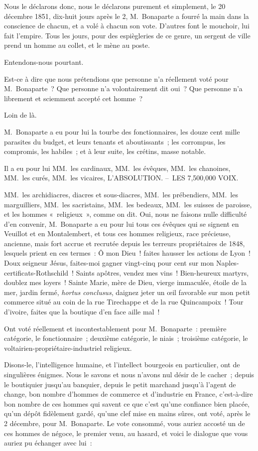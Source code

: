 \documentclass[french,twoside]{book} %
\begin{document}
\noindent Nous le déclarons donc, nous le déclarons purement et simplement, le 20 décembre 1851, dix-huit jours après le 2, M. Bonaparte a fourré la main dans la conscience de chacun, et a volé à chacun son vote. D’autres font le mouchoir, lui fait l’empire. Tous les jours, pour des espiègleries de ce genre, un sergent de ville prend un homme au collet, et le mène au poste.\par
Entendons-nous pourtant.\par
Est-ce à dire que nous prétendions que personne n’a réellement voté pour M. Bonaparte ? Que personne n’a volontairement dit oui ? Que personne n’a librement et sciemment accepté cet homme ?\par
Loin de là.\par
M. Bonaparte a eu pour lui la tourbe des fonctionnaires, les douze cent mille parasites du budget, et leurs tenants et aboutissants ; les corrompus, les compromis, les habiles ; et à leur suite, les crétins, masse notable.\par
Il a eu pour lui MM. les cardinaux, MM. les évêques, MM. les chanoines, MM. les curés, MM. les vicaires, L’ABSOLUTION. – LES 7,500,000 VOIX.\par
MM. les archidiacres, diacres et sous-diacres, MM. les prébendiers, MM. les marguilliers, MM. les sacristains, MM. les bedeaux, MM. les suisses de paroisse, et les hommes « religieux », comme on dit. Oui, nous ne faisons nulle difficulté d’en convenir, M. Bonaparte a eu pour lui tous ces évêques qui se signent en Veuillot et en Montalembert, et tous ces hommes religieux, race précieuse, ancienne, mais fort accrue et recrutée depuis les terreurs propriétaires de 1848, lesquels prient en ces termes : Ô mon Dieu ! faites hausser les actions de Lyon ! Doux seigneur Jésus, faites-moi gagner vingt-cinq pour cent sur mon Naples-certificats-Rothschild ! Saints apôtres, vendez mes vins ! Bien-heureux martyrs, doublez mes loyers ! Sainte Marie, mère de Dieu, vierge immaculée, étoile de la mer, jardin fermé, \emph{hortus conclusus}, daignez jeter un œil favorable sur mon petit commerce situé au coin de la rue Tirechappe et de la rue Quincampoix ! Tour d’ivoire, faites que la boutique d’en face aille mal !\par
Ont voté réellement et incontestablement pour M. Bonaparte : première catégorie, le fonctionnaire ; deuxième catégorie, le niais ; troisième catégorie, le voltairien-propriétaire-industriel religieux.\par
Disons-le, l’intelligence humaine, et l’intellect bourgeois en particulier, ont de singulières énigmes. Nous le savons et nous n’avons nul désir de le cacher ; depuis le boutiquier jusqu’au banquier, depuis le petit marchand jusqu’à l’agent de change, bon nombre d’hommes de commerce et d’industrie en France, c’est-à-dire bon nombre de ces hommes qui savent ce que c’est qu’une confiance bien placée, qu’un dépôt fidèlement gardé, qu’une clef mise en mains sûres, ont voté, après le 2 décembre, pour M. Bonaparte. Le vote consommé, vous auriez accosté un de ces hommes de négoce, le premier venu, au hasard, et voici le dialogue que vous auriez pu échanger avec lui :\par
\end{document}
